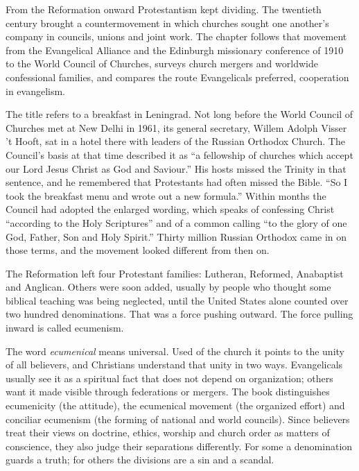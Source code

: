 
\begin{inbrief}
From the Reformation onward Protestantism kept dividing. The twentieth century brought a
countermovement in which churches sought one another's company in councils, unions and joint work.
The chapter follows that movement from the Evangelical Alliance and the Edinburgh missionary
conference of 1910 to the World Council of Churches, surveys church mergers and worldwide
confessional families, and compares the route Evangelicals preferred, cooperation in evangelism.
\end{inbrief}

The title refers to a breakfast in Leningrad. Not long before the World Council of Churches met at
New Delhi in 1961, its general secretary, Willem Adolph Visser 't Hooft, sat in a hotel there with
leaders of the Russian Orthodox Church. The Council's basis at that time described it as ``a
fellowship of churches which accept our Lord Jesus Christ as God and Saviour.'' His hosts missed the
Trinity in that sentence, and he remembered that Protestants had often missed the Bible. ``So I took
the breakfast menu and wrote out a new formula.'' Within months the Council had adopted the enlarged
wording, which speaks of confessing Christ ``according to the Holy Scriptures'' and of a common
calling ``to the glory of one God, Father, Son and Holy Spirit.'' Thirty million Russian Orthodox
came in on those terms, and the movement looked different from then on.

The Reformation left four Protestant families: Lutheran, Reformed, Anabaptist and Anglican. Others
were soon added, usually by people who thought some biblical teaching was being neglected, until the
United States alone counted over two hundred denominations. That was a force pushing outward. The
force pulling inward is called ecumenism.

The word \emph{ecumenical} means universal. Used of the church it points to the unity of all
believers, and Christians understand that unity in two ways. Evangelicals usually see it as a
spiritual fact that does not depend on organization; others want it made visible through federations
or mergers. The book distinguishes ecumenicity (the attitude), the ecumenical movement (the organized
effort) and conciliar ecumenism (the forming of national and world councils). Since believers treat
their views on doctrine, ethics, worship and church order as matters of conscience, they also judge
their separations differently. For some a denomination guards a truth; for others the divisions are
a sin and a scandal.

